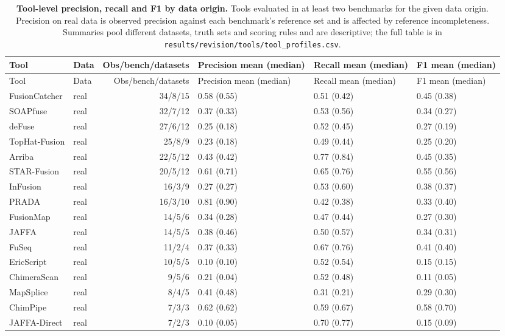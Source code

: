 {\scriptsize
\begin{longtable}{llrlll}
\caption{\textbf{Tool-level precision, recall and F1 by data origin.} Tools evaluated in at least two benchmarks for the given data origin. Precision on real data is observed precision against each benchmark's reference set and is affected by reference incompleteness. Summaries pool different datasets, truth sets and scoring rules and are descriptive; the full table is in \texttt{results/revision/tools/tool\_profiles.csv}.}\label{tab:supp_tool_profiles}\\
\toprule
Tool & Data & Obs/bench/datasets & Precision mean (median) & Recall mean (median) & F1 mean (median) \\
\midrule
\endfirsthead
\toprule
Tool & Data & Obs/bench/datasets & Precision mean (median) & Recall mean (median) & F1 mean (median) \\
\midrule
\endhead
FusionCatcher & real & 34/8/15 & 0.58 (0.55) & 0.51 (0.42) & 0.45 (0.38) \\
SOAPfuse & real & 32/7/12 & 0.37 (0.33) & 0.53 (0.56) & 0.34 (0.27) \\
deFuse & real & 27/6/12 & 0.25 (0.18) & 0.52 (0.45) & 0.27 (0.19) \\
TopHat-Fusion & real & 25/8/9 & 0.23 (0.18) & 0.49 (0.44) & 0.25 (0.20) \\
Arriba & real & 22/5/12 & 0.43 (0.42) & 0.77 (0.84) & 0.45 (0.35) \\
STAR-Fusion & real & 20/5/12 & 0.61 (0.71) & 0.65 (0.76) & 0.55 (0.56) \\
InFusion & real & 16/3/9 & 0.27 (0.27) & 0.53 (0.60) & 0.38 (0.37) \\
PRADA & real & 16/3/10 & 0.81 (0.90) & 0.42 (0.38) & 0.33 (0.40) \\
FusionMap & real & 14/5/6 & 0.34 (0.28) & 0.47 (0.44) & 0.27 (0.30) \\
JAFFA & real & 14/5/5 & 0.38 (0.46) & 0.50 (0.57) & 0.34 (0.31) \\
FuSeq & real & 11/2/4 & 0.37 (0.33) & 0.67 (0.76) & 0.41 (0.40) \\
EricScript & real & 10/5/5 & 0.10 (0.10) & 0.52 (0.54) & 0.15 (0.15) \\
ChimeraScan & real & 9/5/6 & 0.21 (0.04) & 0.52 (0.48) & 0.11 (0.05) \\
MapSplice & real & 8/4/5 & 0.41 (0.48) & 0.31 (0.21) & 0.29 (0.30) \\
ChimPipe & real & 7/3/3 & 0.62 (0.62) & 0.59 (0.67) & 0.58 (0.70) \\
JAFFA-Direct & real & 7/2/3 & 0.10 (0.05) & 0.70 (0.77) & 0.15 (0.09) \\

\end{longtable}}
